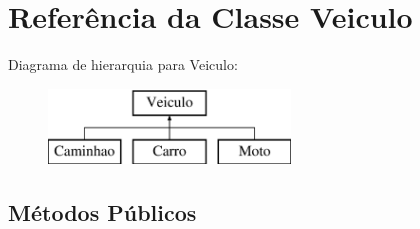 \hypertarget{class_veiculo}{}\section{Referência da Classe Veiculo}
\label{class_veiculo}
Diagrama de hierarquia para Veiculo\+:\begin{figure}[H]
\begin{center}
\leavevmode
\includegraphics[height=2.000000cm]{class_veiculo}
\end{center}
\end{figure}
\subsection*{Métodos Públicos}
